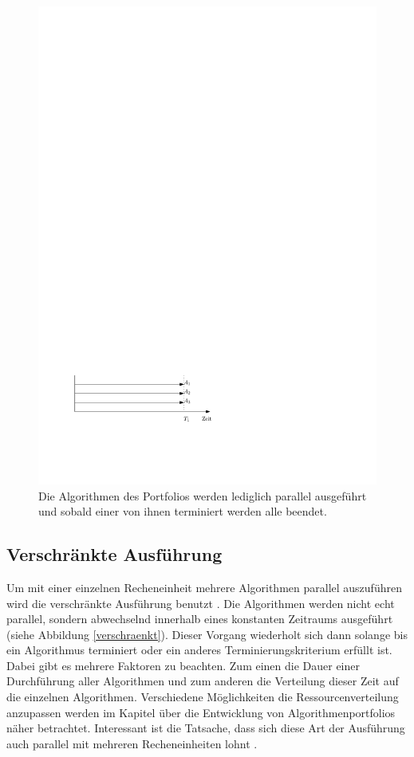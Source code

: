 \begin{figure}[h]
\centering
\includegraphics{parallel.pdf}
\caption[Parallele Ausf\"uhrung]{Die Algorithmen des Portfolios werden lediglich parallel ausgeführt und sobald einer von ihnen terminiert werden alle beendet.}
\label{parallel}
\end{figure}

\subsection{Verschränkte Ausführung}

Um mit einer einzelnen Recheneinheit mehrere Algorithmen parallel auszuführen wird die verschränkte Ausführung benutzt \cite{gaglioloschmidhuber06}. Die Algorithmen werden nicht echt parallel, sondern abwechselnd innerhalb eines konstanten Zeitraums ausgeführt (siehe Abbildung \ref{verschraenkt}). Dieser Vorgang wiederholt sich dann solange bis ein Algorithmus terminiert oder ein anderes Terminierungskriterium erfüllt ist. Dabei gibt es mehrere Faktoren zu beachten. Zum einen die Dauer einer Durchführung aller Algorithmen und zum anderen die Verteilung dieser Zeit auf die einzelnen Algorithmen. Verschiedene Möglichkeiten die Ressourcenverteilung anzupassen werden im Kapitel über die Entwicklung von Algorithmenportfolios näher betrachtet. Interessant ist die Tatsache, dass sich diese Art der Ausführung auch parallel mit mehreren Recheneinheiten lohnt \cite{gagliolo08}.

